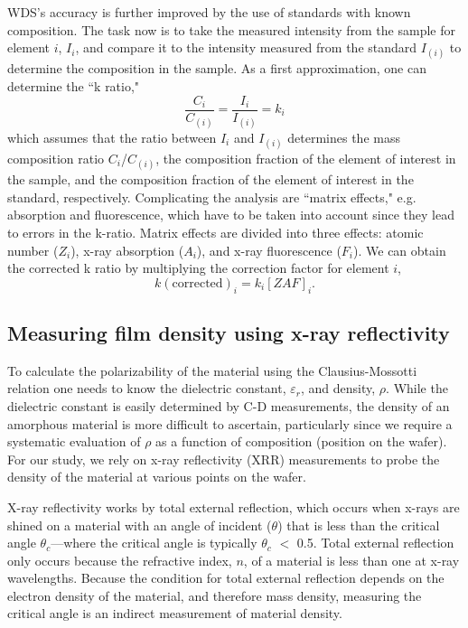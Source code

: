 WDS's accuracy is further improved by the use of standards with known composition. The task now is to take the measured intensity from the sample for element $i$, ${I_{i}}$, and compare it to the intensity measured from the standard ${I_{(i)}}$ to determine the composition in the sample. As a first approximation, one can determine the ``k ratio,"
\begin{equation}\label{eq:kratio}
\frac{C_{i}}{C_{(i)}} = \frac{I_{i}}{I_{(i)}} = k_{i}
\end{equation}
which assumes that the ratio between ${I_{i}}$ and ${I_{(i)}}$ determines the mass composition ratio $C_{i}$/$C_{(i)}$, the composition fraction of the element of interest in the sample, and the composition fraction of the element of interest in the standard, respectively. Complicating the analysis are ``matrix effects," e.g. absorption and fluorescence, which have to be taken into account since they lead to errors in the k-ratio. Matrix effects are divided into three effects: atomic number ($Z_{i}$), x-ray absorption ($A_{i}$), and x-ray fluorescence ($F_{i}$). We can obtain the corrected k ratio by multiplying the correction factor for element $i$,
\begin{equation}\label{eq:zaf}
k(\text{corrected})_{i} = k_{i} [ZAF]_{i}.
\end{equation}

\subsection{Measuring film density using x-ray reflectivity}

To calculate the polarizability of the material using the Clausius-Mossotti relation one needs to know the dielectric constant, $\varepsilon_{r}$, and density, $\rho$. While the dielectric constant is easily determined by C-D measurements, the density of an amorphous material is more difficult to ascertain, particularly since we require a systematic evaluation of $\rho$ as a function of composition (position on the wafer). For our study, we rely on x-ray reflectivity (XRR) measurements to probe the density of the material at various points on the wafer. 

X-ray reflectivity works by total external reflection, which occurs when x-rays are shined on a material with an angle of incident ($\theta$) that is less than the critical angle $\theta_{c}$---where the critical angle is typically $\theta_{c}$ $<$ 0.5. Total external reflection only occurs because the refractive index, $n$, of a material is less than one at x-ray wavelengths. Because the condition for total external reflection depends on the electron density of the material, and therefore mass density, measuring the critical angle is an indirect measurement of material density. 


